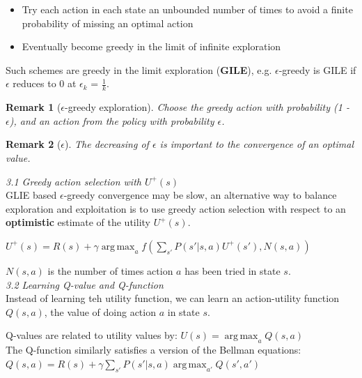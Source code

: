 \documentclass[12pt]{article}
\newtheorem*{remark}{Remark}
\begin{document}
\begin{itemize}
\item Try each action in each state an unbounded number of times to avoid a finite probability of missing an optimal action
\item Eventually become greedy in the limit of infinite exploration
\end{itemize}
\noindent
Such schemes are greedy in the limit exploration (\textbf{GILE}), e.g. $\epsilon$-greedy is GILE if $\epsilon$ reduces to 0 at $\epsilon_k$ = $\frac{1}{k}$. 

\begin{remark}[$\epsilon$-greedy exploration]
Choose the greedy action with probability (1 - $\epsilon$), and an action from the policy with probability $\epsilon$.
\end{remark}
\begin{remark}[$\epsilon$]
The decreasing of $\epsilon$ is important to the convergence of an optimal value.
\end{remark}

\noindent
\textsl{3.1 Greedy action selection with $U^+(s)$}\\

\noindent
GLIE based  $\epsilon$-greedy convergence may be slow, an alternative way to balance exploration and exploitation 
 is to use greedy action selection with respect to an \textbf{optimistic} estimate of the utility $U^+(s)$.\\
 
 \begin{tcolorbox}
$U^+(s) = R(s) + \gamma \operatorname*{arg\,max}_a { f(\sum_{s'}^{} P(s' | s, a) U^+(s'), N(s, a))}$ 
 \end{tcolorbox}
 \noindent
 $N(s, a)$ is the number of times action $a$ has been tried in state $s$.\\

\noindent
\textsl{3.2 Learning Q-value and Q-function}\\

\noindent
Instead of learning teh utility function, we can learn an action-utility function $Q(s, a)$, the value of doing action $a$ in state $s$. \\

\begin{tcolorbox}
Q-values are related to utility values by: $U(s) = \operatorname*{arg\,max}_a{Q(s, a)}$\\

The Q-function similarly satisfies a version of the Bellman equations: $Q(s, a) = R(s) + \gamma \sum_{s'}^{} P(s' | s, a)  \operatorname*{arg\,max}_{a'}{Q(s', a')}$
\end{tcolorbox}
\end{document}
